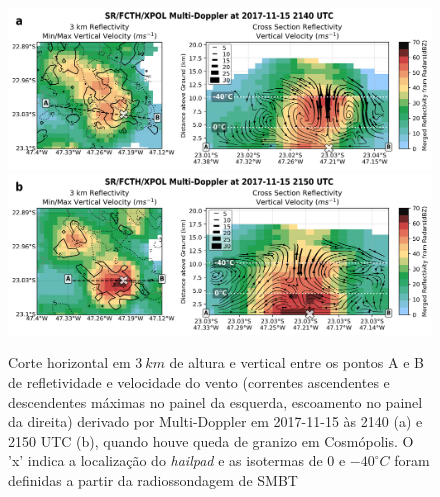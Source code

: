 \begin{figure}[htb]
	\centering
	\caption{Corte horizontal em $3\:km$ de altura e vertical entre os pontos A e B de refletividade e velocidade do vento (correntes ascendentes e descendentes máximas no painel da esquerda, escoamento no painel da direita) derivado por Multi-Doppler em 2017-11-15 às 2140 (a) e 2150 UTC (b), quando houve queda de granizo em Cosmópolis. O 'x' indica a localização do \textit{hailpad} e as isotermas de $0$ e $-40^{\circ}C$ foram definidas a partir da radiossondagem de SMBT} 
	\label{doppler_20171115}
	\vspace{-5pt}
	\includegraphics[width=\columnwidth]{../MultiDoppler_Processing/figures/SR-FCTH-XPOL 2017-11-15 2140 UTC.png} \\
	\vspace{-5pt}
	\includegraphics[width=\columnwidth]{../MultiDoppler_Processing/figures/SR-FCTH-XPOL 2017-11-15 2150 UTC.png} \\
\end{figure}
